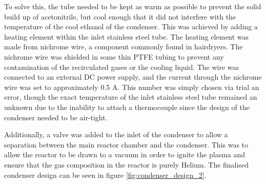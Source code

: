 To solve this, the tube needed to be kept as warm as possible to prevent the solid build up of acetonitrile, but cool enough that it did not interfere with the temperature of the cool ethanol of the condenser. This was achieved by adding a heating element within the inlet stainless steel tube. The heating element was made from nichrome wire, a component commonly found in hairdryers. The nichrome wire was shielded in some thin PTFE tubing to prevent any contamination of the recirculated gases or the cooling liquid. The wire was connected to an external DC power supply, and the current through the nichrome wire was set to approximately 0.5 A. This number was simply chosen via trial an error, though the exact temperature of the inlet stainless steel tube remained an unknown due to the inability to attach a thermocouple since the design of the condenser needed to be air-tight. 

Additionally, a valve was added to the inlet of the condenser to allow a separation between the main reactor chamber and the condenser. This was to allow the reactor to be drawn to a vacuum in order to ignite the plasma and ensure that the gas composition in the reactor is purely Helium. The finalised condenser design can be seen in figure \ref{fig:condenser_design_2}.

